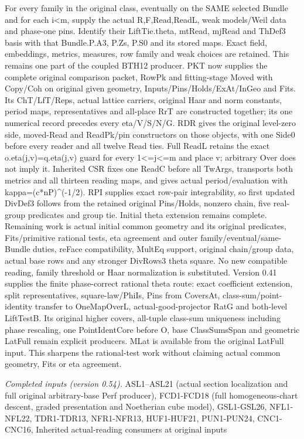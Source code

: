 \documentclass[11pt,a4paper]{article}
\numberwithin{equation}{section}
\theoremstyle{remark}\newtheorem{remark}[theorem]{Remark}
\begin{document}
For every family in the original class, eventually on the SAME selected Bundle and for each i<m, supply the actual R,F,Read,ReadL, weak models/Weil data and phase-one pins. Identify their LiftTie.theta, mtRead, mjRead and ThDef3 basis with that Bundle.P.A3, P.Zs, P.S0 and its stored maps. Exact field, embeddings, metrics, measures, row family and weak choices are retained. This remains one part of the coupled BTH12 producer. PKT now supplies the complete original comparison packet, RowPk and fitting-stage Moved with Copy/Coh on original given geometry, Inputs/Pins/Holds/ExAt/InGeo and Fits. Its ChT/LfT/Reps, actual lattice carriers, original Haar and norm constants, period maps, representatives and all-place RrT are constructed together; its one numerical record precedes every eta/V/S/N/G. RDR gives the original level-zero side, moved-Read and ReadPk/pin constructors on those objects, with one Side0 before every reader and all twelve Read ties. Full ReadL retains the exact o.eta(j,v)=q.eta(j,v) guard for every 1<=j<=m and place v; arbitrary Over does not imply it. Inherited CSR fixes one ReadC before all TwArgs, transports both metrics and all thirteen reading maps, and gives actual period/evaluation with kappa=(c*nP)\textasciicircum{}(-1/2). RPI supplies exact row-pair integrability, so first updated DivDef3 follows from the retained original Pins/Holds, nonzero chain, five real-group predicates and group tie. Initial theta extension remains complete. Remaining work is actual initial common geometry and its original predicates, Fits/primitive rational tests, eta agreement and outer family/eventual/same-Bundle duties, reFace compatibility, MultEq support, original chain/group data, actual base rows and any stronger DivRows3 theta square. No new compatible reading, family threshold or Haar normalization is substituted. Version 0.41 supplies the finite phase-correct rational theta route: exact coefficient extension, split representatives, square-law/PhiIs, Pins from CoversAt, class-sum/point-identity transfer to OneMapOverL, actual-good-projector RatG and both-level LiftTestB. Its original higher covers, all-tuple class-sum uniqueness including phase rescaling, one PointIdentCore before O, base ClassSumsSpan and geometric LatFull remain explicit producers. MLat is available from the original LatFull input. This sharpens the rational-test work without claiming actual common geometry, Fits or eta agreement.

\emph{Completed inputs (version 0.54).} ASL1–ASL21 (actual section localization and full original arbitrary-base Perf producer), FCD1-FCD18 (full homogeneous-chart descent, graded presentation and Noetherian cube model), GSL1-GSL26, NFL1-NFL22, TDR1-TDR13, NFR1-NFR13, HUF1-HUF21, PUN1-PUN24, CNC1-CNC16, Inherited actual-reading consumers at original inputs
\end{document}
